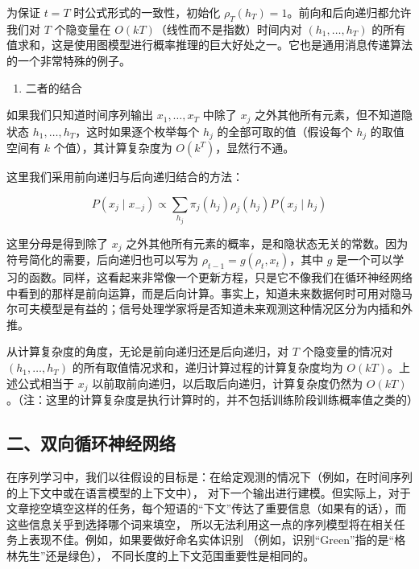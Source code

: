 为保证 \(t=T\) 时公式形式的一致性，初始化 \(\rho_T(h_T)=1\)。前向和后向递归都允许我们对 \(T\) 个隐变量在 \(O(kT)\)（线性而不是指数）时间内对 \((h_1,\ldots,h_T)\) 的所有值求和，这是使用图模型进行概率推理的巨大好处之一。它也是通用消息传递算法的一个非常特殊的例子。

\begin{enumerate}
\def\labelenumi{\arabic{enumi}.}
\setcounter{enumi}{2}
\tightlist
\item
  二者的结合
\end{enumerate}

如果我们只知道时间序列输出 \(x_1,\ldots,x_T\) 中除了 \(x_j\) 之外其他所有元素，但不知道隐状态 \(h_1,\ldots,h_T\)，这时如果逐个枚举每个 \(h_j\) 的全部可取的值（假设每个 \(h_j\) 的取值空间有 \(k\) 个值），其计算复杂度为 \(O(k^T)\)，显然行不通。

这里我们采用前向递归与后向递归结合的方法：

\[
P(x_j \mid x_{-j}) \propto \sum_{h_j}\pi_j(h_j)\rho_j(h_j)P(x_j \mid h_j)
\]

这里分母是得到除了 \(x_j\) 之外其他所有元素的概率，是和隐状态无关的常数。因为符号简化的需要，后向递归也可以写为 \(\rho_{t-1}=g(\rho_t,x_t)\)，其中 \(g\) 是一个可以学习的函数。同样，这看起来非常像一个更新方程，只是它不像我们在循环神经网络中看到的那样是前向运算，而是后向计算。事实上，知道未来数据何时可用对隐马尔可夫模型是有益的；信号处理学家将是否知道未来观测这种情况区分为内插和外推。

从计算复杂度的角度，无论是前向递归还是后向递归，对 \(T\) 个隐变量的情况对 \((h_1,\ldots,h_T)\) 的所有取值情况求和，递归计算过程的计算复杂度均为 \(O(kT)\)。上述公式相当于 \(x_j\) 以前取前向递归，以后取后向递归，计算复杂度仍然为 \(O(kT)\)。（注：这里的计算复杂度是执行计算时的，并不包括训练阶段训练概率值之类的）

\hypertarget{ux4e8cux53ccux5411ux5faaux73afux795eux7ecfux7f51ux7edc}{%
\subsection{二、双向循环神经网络}\label{ux4e8cux53ccux5411ux5faaux73afux795eux7ecfux7f51ux7edc}}

在序列学习中，我们以往假设的目标是：在给定观测的情况下（例如，在时间序列的上下文中或在语言模型的上下文中）， 对下一个输出进行建模。但实际上，对于文章挖空填空这样的任务，每个短语的``下文''传达了重要信息（如果有的话），而这些信息关乎到选择哪个词来填空， 所以无法利用这一点的序列模型将在相关任务上表现不佳。例如，如果要做好命名实体识别 （例如，识别``Green''指的是``格林先生''还是绿色）， 不同长度的上下文范围重要性是相同的。

